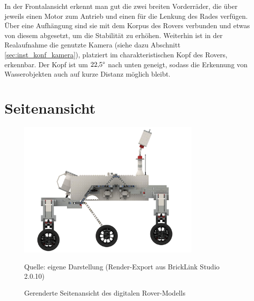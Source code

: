 In der Frontalansicht erkennt man gut die zwei breiten Vorderräder, die über jeweils einen Motor zum Antrieb und einen für die Lenkung des Rades verfügen.
Über eine Aufhängung sind sie mit dem Korpus des Rovers verbunden und etwas von diesem abgesetzt, um die Stabilität zu erhöhen.
Weiterhin ist in der Realaufnahme die genutzte Kamera (siehe dazu Abschnitt \ref{sec:inst_konf_kamera}), platziert im charakteristischen Kopf des Rovers, erkennbar.
Der Kopf ist um $22{,}5 \degree$ nach unten geneigt, sodass die Erkennung von Wasserobjekten auch auf kurze Distanz möglich bleibt.

\section{Seitenansicht}
\label{sec:seitenansicht}

\begin{figure}
	\centering
	\includegraphics[width=0.8\textwidth]{../Images/20200424_Mars_Rover_V5_side.png}
	\vspace{0.5em}
	\parbox[c]{0.8\linewidth}{\footnotesize
		\centering
		\vspace{1em}
		Quelle: eigene Darstellung (Render-Export aus BrickLink Studio 2.0.10)
	}
	\caption{Gerenderte Seitenansicht des digitalen Rover-Modells}
	\label{fig:roversiderender}
\end{figure}

